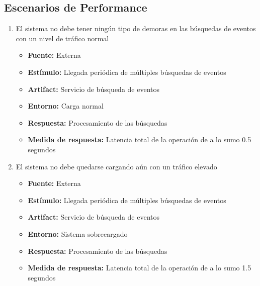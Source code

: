 \subsection{Escenarios de Performance}
\begin{enumerate}
  \item El sistema no debe tener ningún tipo de demoras en las búsquedas de eventos con un nivel de tráfico normal
  \begin{itemize}  
    \item \textbf{Fuente:} Externa
    \item \textbf{Estímulo:} Llegada periódica de múltiples búsquedas de eventos
    \item \textbf{Artifact:} Servicio de búsqueda de eventos
    \item \textbf{Entorno:} Carga normal
    \item \textbf{Respuesta:} Procesamiento de las búsquedas
    \item \textbf{Medida de respuesta:} Latencia total de la operación de a lo sumo 0.5 segundos
  \end{itemize}

  \item El sistema no debe quedarse cargando aún con un tráfico elevado
  \begin{itemize}  
    \item \textbf{Fuente:} Externa
    \item \textbf{Estímulo:} Llegada periódica de múltiples búsquedas de eventos
    \item \textbf{Artifact:} Servicio de búsqueda de eventos
    \item \textbf{Entorno:} Sistema sobrecargado
    \item \textbf{Respuesta:} Procesamiento de las búsquedas
    \item \textbf{Medida de respuesta:} Latencia total de la operación de a lo sumo 1.5 segundos
  \end{itemize}
\end{enumerate}